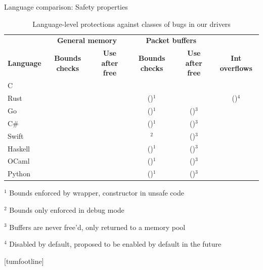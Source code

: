 \documentclass[NET,english,aspectratio=169,notitleframe]{tumbeamer}
\newcommand{\cmark}{\textcolor{TUMDarkGreen}{\ding{51}}}%
\newcommand{\xmark}{\textcolor{TUMDarkRed}{\ding{55}}}%
\begin{document}
\begin{frame}{Language comparison: Safety properties}
\begin{table}[t]
 \setlength{\tabcolsep}{1.3mm}
	\centering
	\footnotesize
	\begin{tabular}{lccccc}
		& \multicolumn{2}{c}{\textbf{General memory}} & \multicolumn{2}{c}{\hspace{-1em}\textbf{Packet buffers}}  \\
		\textbf{Language} & \textbf{Bounds checks} & \textbf{Use after free}  & \textbf{Bounds checks} & \textbf{Use after free} & \textbf{Int overflows} \\
		\toprule
		C & \xmark & \xmark & \xmark & \xmark & \xmark \\
		Rust & \cmark & \cmark & (\cmark)$^1$ & \cmark & (\cmark)$^4$ \\
		Go & \cmark & \cmark & (\cmark)$^1$ & (\cmark)$^3$ & \xmark \\
		C\# & \cmark & \cmark & (\cmark)$^1$ & (\cmark)$^3$ & \xmark \\
		Swift & \cmark & \cmark & \xmark$^2$ & (\cmark)$^3$ & \cmark \\
		Haskell & \cmark & \cmark & (\cmark)$^1$ & (\cmark)$^3$ & \xmark \\
		OCaml & \cmark & \cmark & (\cmark)$^1$ & (\cmark)$^3$ & \xmark \\
		Python & \cmark & \cmark & (\cmark)$^1$ & (\cmark)$^3$ & \xmark \\
		\bottomrule
	\end{tabular}
	\begin{tablenotes}
	\item $^1$ Bounds enforced by wrapper, constructor in unsafe code
	\item $^2$ Bounds only enforced in debug mode
	\item $^3$ Buffers are never free'd, only returned to a memory pool
	\item $^4$ Disabled by default, proposed to be enabled by default in the future
	\end{tablenotes}
	\caption{Language-level protections against classes of bugs in our drivers}
	\label{tbl:lang-safety}
	\vspace{-3em}
\end{table}
\end{frame}
[tumfootline]
\end{document}
